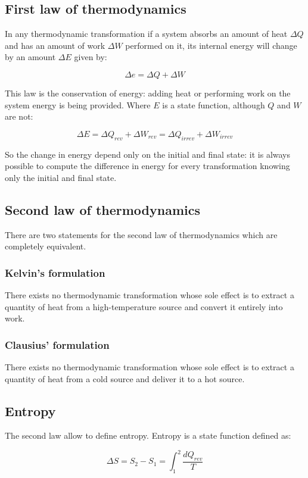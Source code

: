 	\subsection{First law of thermodynamics}
	In any thermodynamic transformation if a system absorbs an amount of heat $\Delta Q$ and has an amount of work $\Delta W$ performed on it, its internal energy will change by an amount $\Delta E$ given by:

	$$\Delta e = \Delta Q + \Delta W$$

	This law is the conservation of energy: adding heat or performing work on the system energy is being provided.
	Where $E$ is a state function, although $Q$ and $W$ are not:

	$$\Delta E = \Delta Q_{rev} + \Delta W_{rev} = \Delta Q_{irrev} + \Delta W_{irrev}$$

	So the change in energy depend only on the initial and final state: it is always possible to compute the difference in energy for every transformation knowing only the initial and final state.

	\subsection{Second law of thermodynamics}
	There are two statements for the second law of thermodynamics which are completely equivalent.

		\subsubsection{Kelvin's formulation}
		There exists no thermodynamic transformation whose sole effect is to extract a quantity of heat from a high-temperature source and convert it entirely into work.

		\subsubsection{Clausius' formulation}
		There exists no thermodynamic transformation whose sole effect is to extract a quantity of heat from a cold source and deliver it to a hot source.

	\subsection{Entropy}
	The second law allow to define entropy.
	Entropy is a state function defined as:

	$$\Delta S = S_2-S_1 = \int_1^2\frac{dQ_{rev}}{T}$$

